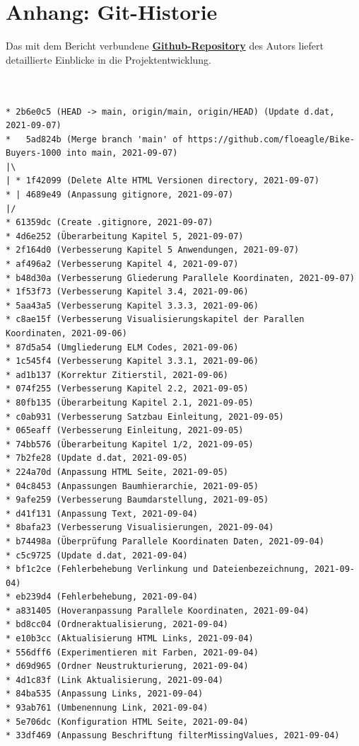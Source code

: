 \documentclass[usegeometry=true]{scrartcl}
\begin{document}
\section*{Anhang: Git-Historie}
Das mit dem Bericht verbundene \href{https://github.com/floeagle/Bike-Buyers-1000}{\textbf{Github-Repository}} des Autors liefert detaillierte Einblicke in die Projektentwicklung. 
\begin{verbatim}


* 2b6e0c5 (HEAD -> main, origin/main, origin/HEAD) (Update d.dat, 2021-09-07)
*   5ad824b (Merge branch 'main' of https://github.com/floeagle/Bike-Buyers-1000 into main, 2021-09-07)
|\
| * 1f42099 (Delete Alte HTML Versionen directory, 2021-09-07)
* | 4689e49 (Anpassung gitignore, 2021-09-07)
|/
* 61359dc (Create .gitignore, 2021-09-07)
* 4d6e252 (Überarbeitung Kapitel 5, 2021-09-07)
* 2f164d0 (Verbesserung Kapitel 5 Anwendungen, 2021-09-07)
* af496a2 (Verbesserung Kapitel 4, 2021-09-07)
* b48d30a (Verbesserung Gliederung Parallele Koordinaten, 2021-09-07)
* 1f53f73 (Verbesserung Kapitel 3.4, 2021-09-06)
* 5aa43a5 (Verbesserung Kapitel 3.3.3, 2021-09-06)
* c8ae15f (Verbesserung Visualisierungskapitel der Parallen Koordinaten, 2021-09-06)
* 87d5a54 (Umgliederung ELM Codes, 2021-09-06)
* 1c545f4 (Verbesserung Kapitel 3.3.1, 2021-09-06)
* ad1b137 (Korrektur Zitierstil, 2021-09-06)
* 074f255 (Verbesserung Kapitel 2.2, 2021-09-05)
* 80fb135 (Überarbeitung Kapitel 2.1, 2021-09-05)
* c0ab931 (Verbesserung Satzbau Einleitung, 2021-09-05)
* 065eaff (Verbesserung Einleitung, 2021-09-05)
* 74bb576 (Überarbeitung Kapitel 1/2, 2021-09-05)
* 7b2fe28 (Update d.dat, 2021-09-05)
* 224a70d (Anpassung HTML Seite, 2021-09-05)
* 04c8453 (Anpassungen Baumhierarchie, 2021-09-05)
* 9afe259 (Verbesserung Baumdarstellung, 2021-09-05)
* d41f131 (Anpassung Text, 2021-09-04)
* 8bafa23 (Verbesserung Visualisierungen, 2021-09-04)
* b74498a (Überprüfung Parallele Koordinaten Daten, 2021-09-04)
* c5c9725 (Update d.dat, 2021-09-04)
* bf1c2ce (Fehlerbehebung Verlinkung und Dateienbezeichnung, 2021-09-04)
* eb239d4 (Fehlerbehebung, 2021-09-04)
* a831405 (Hoveranpassung Parallele Koordinaten, 2021-09-04)
* bd8cc04 (Ordneraktualisierung, 2021-09-04)
* e10b3cc (Aktualisierung HTML Links, 2021-09-04)
* 556dff6 (Experimentieren mit Farben, 2021-09-04)
* d69d965 (Ordner Neustrukturierung, 2021-09-04)
* 4d1c83f (Link Aktualisierung, 2021-09-04)
* 84ba535 (Anpassung Links, 2021-09-04)
* 93ab761 (Umbenennung Link, 2021-09-04)
* 5e706dc (Konfiguration HTML Seite, 2021-09-04)
* 33df469 (Anpassung Beschriftung filterMissingValues, 2021-09-04)

\end{verbatim}
\end{document}
